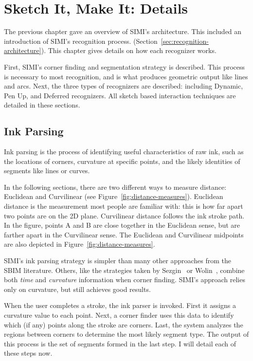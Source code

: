 \chapter{Sketch It, Make It: Details}
\label{sec:details}

The previous chapter gave an overview of SIMI's architecture. This
included an introduction of SIMI's recognition process.
(Section~\ref{sec:recognition-architecture}). This chapter gives
details on how each recognizer works. 

First, SIMI's corner finding and segmentation strategy is
described. This process is necessary to most recognition, and is what
produces geometric output like lines and arcs. Next, the three types
of recognizers are described: including Dynamic, Pen Up, and Deferred
recognizers. All sketch based interaction techniques are detailed in
these sections.

\section{Ink Parsing}
\label{sec:corner-finder}

Ink parsing is the process of identifying useful characteristics of
raw ink, such as the locations of corners, curvature at specific
points, and the likely identities of segments like lines or curves.

In the following sections, there are two different ways to measure
distance: Euclidean and Curvilinear (see
Figure~\ref{fig:distance-measures}). Euclidean distance is the
measurement most people are familiar with: this is how far apart two
points are on the 2D plane. Curvilinear distance follows the ink
stroke path. In the figure, points A and B are close together in the
Euclidean sense, but are farther apart in the Curvilinear sense. The
Euclidean and Curvilinear midpoints are also depicted in
Figure~\ref{fig:distance-measures}. 



SIMI's ink parsing strategy is simpler than many other approaches from
the SBIM literature. Others, like the strategies taken by
Sezgin~\cite{sezgin-early-processing} or Wolin~\cite{wolin-smr},
combine both \textit{time} and \textit{curvature} information when
corner finding. SIMI's approach relies only on curvature, but still
achieves good results.

When the user completes a stroke, the ink parser is invoked. First it
assigns a curvature value to each point. Next, a corner finder uses
this data to identify which (if any) points along the stroke are
corners. Last, the system analyzes the regions between corners to
determine the most likely segment type. The output of this process is
the set of segments formed in the last step. I will detail each of
these steps now.

